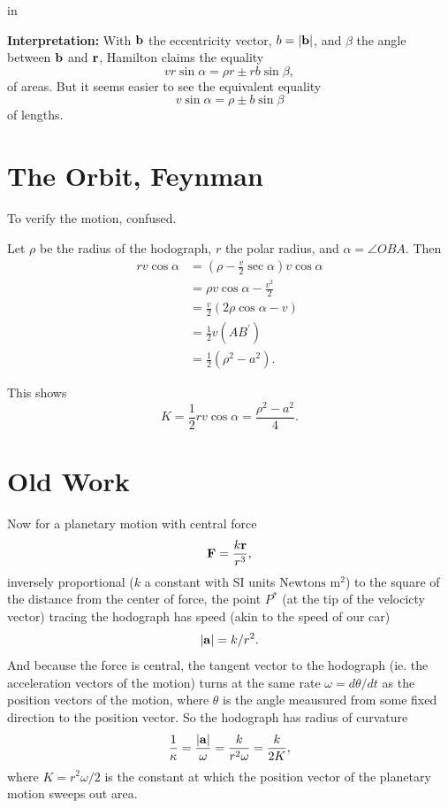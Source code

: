 \documentclass{ximera}
\newcommand{\pskip}{\vskip 0.1 in}
\begin{document}
\pskip

{\bf Interpretation:} With ${\bf b}$ the eccentricity vector, $b = |{\bf b}|$, and $\beta$ the angle between ${\bf b}$ and ${\bf r}$, Hamilton claims the equality 
\[
  v r \sin \alpha = \rho r \pm r b  \sin\beta,
\]
of areas. But it seems easier to see the equivalent equality
\[
 v\sin\alpha =   \rho \pm b\sin\beta   
\]
of lengths.

\section*{The Orbit, Feynman}

To verify the motion, confused.

Let $\rho$ be the radius of the hodograph, $r$ the polar radius, and $\alpha = \angle OBA$. Then
\begin{align*}
r v \cos \alpha &= \left( \rho - \frac{v}{2} \sec \alpha \right) v \cos\alpha \\
                     &= \rho v \cos\alpha - \frac{v^2}{2}  \\
                     &= \frac{v}{2} \left( 2\rho \cos\alpha - v \right) \\
                     &= \frac{1}{2} v (AB^\prime)  \\
                    &= \frac{1}{2} (\rho^2 - a^2) .
\end{align*}

This shows 
\[
  K =  \frac{1}{2}rv\cos \alpha = \frac{\rho^2 - a^2}{4}.
\]







\section*{Old Work}

Now for a planetary motion with central force
\[
   {\bf F} = \frac{k {\bf r}}{r^3},
\] 
inversely proportional ($k$ a constant with SI units $\text{Newtons} \text{ m}^2$) to the square of the distance from the center of force, the point $P^*$ (at the tip of the velocicty vector) tracing the hodograph has speed (akin to the speed of our car)
\[
 | {\bf a} | = k/r^2 . 
\]
And because the force is central, the tangent vector to the hodograph (ie. the acceleration vectors of the motion) turns at the same rate $\omega = d\theta/dt$ as the position vectors of the motion, where $\theta$ is the angle meausured from some fixed direction to the position vector. So the hodograph has radius of curvature
\[
     \frac{1}{\kappa} =  \frac{|{\bf a}|}{\omega} = \frac{k}{r^2 \omega} = \frac{k}{2K},
\]
where $K = r^2\omega/2$ is the constant at which the position vector of the planetary motion sweeps out area.%
\end{document}
